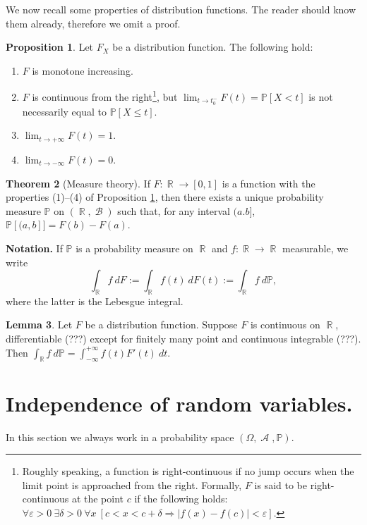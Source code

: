 \documentclass[12pt,a4paper]{report}
\theoremstyle{definition}
\newtheorem{theorem}{Theorem}[chapter] %
\newtheorem{lemma}[theorem]{Lemma}
\newtheorem{proposition}[theorem]{Proposition}
\theoremstyle{num.custom-title}
\DeclareMathOperator{\A}{\mathcal{A}}
\DeclareMathOperator{\B}{\mathcal{B}}
\DeclareMathOperator{\R}{\mathbb{R}}
\DeclareMathOperator{\imp}{\Rightarrow}
\renewcommand{\epsilon}{\varepsilon}
\renewcommand{\1}{\mathbbm{1}}
\renewcommand{\P}{\mathbb{P}}
\begin{document}
We now recall some properties of distribution functions. The reader should know them already, therefore we omit a proof.

\begin{proposition}\label{prop_distr_fun}
Let $F_X$ be a distribution function. The following hold:
\begin{enumerate}
\item $F$ is monotone increasing.
\item $F$ is continuous from the right\footnote{Roughly speaking, a function is right-continuous if no jump occurs when the limit point is approached from the right. Formally, $F$ is said to be right-continuous at the point $c$ if the following holds: $\forall \epsilon > 0 \ \exists \delta>0 \ \forall x\  [c < x <c+\delta \imp |f(x)-f(c)|<\epsilon]$.}, but $\lim_{t \to t_0^-} F(t) = \P[X<t]$ is not necessarily equal to $\P[X \leq t]$.
\item $\lim_{t \to +\infty} F(t) = 1$.
\item $\lim_{t \to -\infty} F(t) = 0$.
\end{enumerate}
\end{proposition}

\begin{theorem}[Measure theory]
If $F: \R \to [0,1]$ is a function with the properties (1)--(4) of Proposition \ref{prop_distr_fun}, then there exists a unique probability measure $\P$ on $(\R,\B)$ such that, for any interval $(a.b]$, $\P[(a,b]] = F(b)-F(a)$.
\end{theorem}

\noindent\textbf{Notation.} If $\P$ is a probability measure on $\R$ and $f : \R \to \R$ measurable, we write
\[
\int_{\R} f \ dF := \int_{\R} f(t) \ dF(t) := \int_{\R} f \ d\P,
\]
where the latter is the Lebesgue integral.

\begin{lemma}
Let $F$ be a distribution function. Suppose $F$ is continuous on $\R$, differentiable (???) except for finitely many point and continuous integrable (???). Then $\int_{\R} f \ d\P = \int_{-\infty}^{+\infty} f(t) F'(t) \ dt$.
\end{lemma}

\section{Independence of random variables.}

In this section we always work in a probability space $(\Omega,\A,\P)$.
\end{document}
